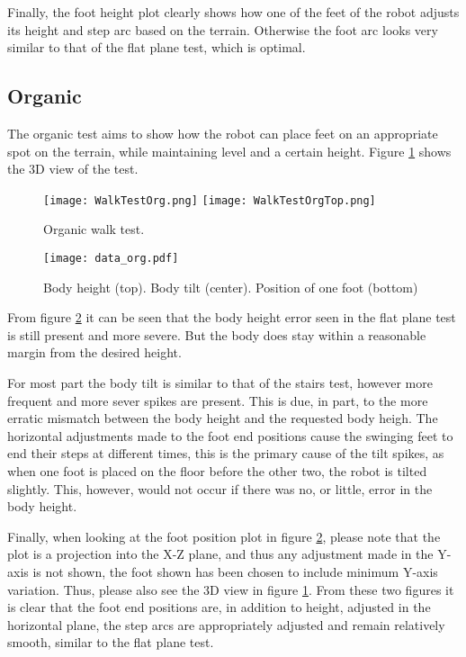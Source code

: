     Finally, the foot height plot clearly shows how one of the feet of the robot adjusts its height and step arc based on the terrain. Otherwise the foot arc looks very similar to that of the
    flat plane test, which is optimal.
    
    \newpage
    \subsection{Organic}
    The organic test aims to show how the robot can place feet on an appropriate spot on the terrain, while maintaining level and a certain height. Figure \ref{fig:org_test} shows the
    3D view of the test.
    \begin{figure}[h]
        \centering
        \texttt{[image: WalkTestOrg.png]}
        \texttt{[image: WalkTestOrgTop.png]}
        \caption{Organic walk test.}
        \label{fig:org_test}
    \end{figure}
    \begin{figure}[h]
        \centering
        \texttt{[image: data\_org.pdf]}
        \caption{Body height (top). Body tilt (center). Position of one foot (bottom)}
        \label{fig:org_test_data}
    \end{figure}

    From figure \ref{fig:org_test_data} it can be seen that the body height error seen in the flat plane test
    is still present and more severe. But the body does stay within a reasonable margin from the desired height.

    For most part the body tilt is similar to that of the stairs test, however more frequent and more sever spikes are present.
    This is due, in part, to the more erratic mismatch between the body height and the requested body heigh. The horizontal adjustments made to 
    the foot end positions cause the swinging feet to end their steps at different times, this is the primary cause of the tilt spikes, as when one
    foot is placed on the floor before the other two, the robot is tilted slightly. This, however, would not occur if there was no, or little, 
    error in the body height.

    Finally, when looking at the foot position plot in figure \ref{fig:org_test_data}, please note that the plot is a projection into the X-Z plane, and thus any
    adjustment made in the Y-axis is not shown, the foot shown has been chosen to include minimum Y-axis variation. 
    Thus, please also see the 3D view in figure \ref{fig:org_test}. From these two figures it is clear that the foot end positions are, in addition to height,
    adjusted in the horizontal plane, the step arcs are appropriately adjusted and remain relatively smooth, similar to the flat plane test.


